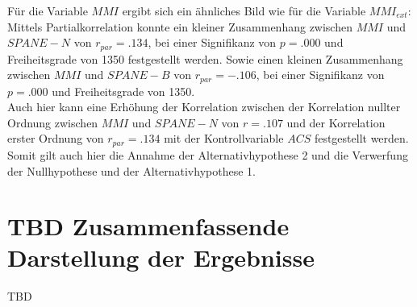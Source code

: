 Für die Variable $MMI$ ergibt sich ein ähnliches Bild wie für die Variable $MMI_{ext}$: Mittels Partialkorrelation konnte ein kleiner Zusammenhang zwischen $MMI$ und $SPANE-N$ von $r_{par}=.134$, bei einer Signifikanz von $p=.000$ und Freiheitsgrade von 1350 festgestellt werden. Sowie einen kleinen Zusammenhang zwischen $MMI$ und $SPANE-B$ von $r_{par}=-.106$, bei einer Signifikanz von $p=.000$ und Freiheitsgrade von 1350. \\
Auch hier kann eine Erhöhung der Korrelation zwischen der Korrelation nullter Ordnung zwischen $MMI$ und $SPANE-N$ von $r=.107$ und der Korrelation erster Ordnung von $r_{par}=.134$ mit der Kontrollvariable $ACS$ festgestellt werden. Somit gilt auch hier die Annahme der Alternativhypothese 2 und die Verwerfung der Nullhypothese und der Alternativhypothese 1. 

\section{TBD Zusammenfassende Darstellung der Ergebnisse}\label{label.ergebnisse.zusammenfassung}
TBD




